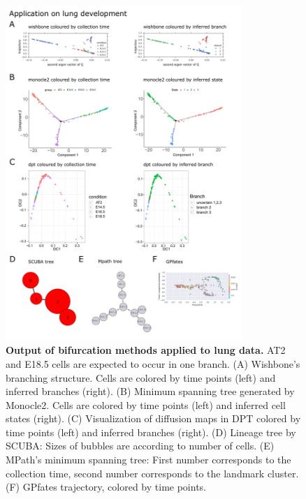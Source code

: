 \begin{figure}
    \centering
    \includegraphics[width=0.8\textwidth]{"results_lung"}
    \caption[Output of bifurcation methods applied to lung data]{\textbf{Output of bifurcation methods applied to lung data.} AT2 and E18.5 cells are expected to occur in one branch. (A) Wishbone's branching structure. Cells are colored by time points (left) and inferred branches (right). (B) Minimum spanning tree generated by Monocle2. Cells are colored by time points (left) and inferred cell states (right). (C) Visualization of diffusion maps in DPT colored by time points (left) and inferred branches (right). (D) Lineage tree by SCUBA: Sizes of bubbles are according to number of cells. (E) MPath's minimum spanning tree: First number corresponds to the collection time, second number corresponds to the landmark cluster. (F) GPfates trajectory, colored by time points.}
    \label{fig:res_lung}
\end{figure}

